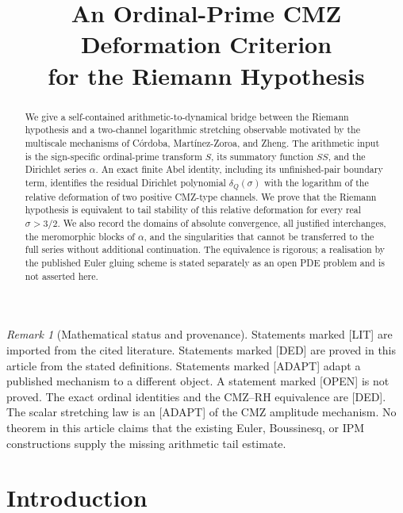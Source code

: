 \documentclass[11pt]{amsart}
\title{An Ordinal-Prime CMZ Deformation Criterion\\
for the Riemann Hypothesis}
\author{}
\date{}
\numberwithin{equation}{section}
\theoremstyle{plain}
\theoremstyle{definition}
\theoremstyle{remark}
\newtheorem{remark}[theorem]{Remark}
\begin{document}
\begin{abstract}
We give a self-contained arithmetic-to-dynamical bridge between the Riemann
hypothesis and a two-channel logarithmic stretching observable motivated by
the multiscale mechanisms of C\'ordoba, Mart\'inez-Zoroa, and Zheng.  The
arithmetic input is the sign-specific ordinal-prime transform $S$, its
summatory function $SS$, and the Dirichlet series $\alpha$.  An exact finite
Abel identity, including its unfinished-pair boundary term, identifies the
residual Dirichlet polynomial $\delta_Q(\sigma)$ with the logarithm of the
relative deformation of two positive CMZ-type channels.  We prove that the
Riemann hypothesis is equivalent to tail stability of this relative
deformation for every real $\sigma>3/2$.  We also record the domains of
absolute convergence, all justified interchanges, the meromorphic blocks of
$\alpha$, and the singularities that cannot be transferred to the full
series without additional continuation.  The equivalence is rigorous; a
realisation by the published Euler gluing scheme is stated separately as an
open PDE problem and is not asserted here.
\end{abstract}

\maketitle

\tableofcontents

\bigskip

\begin{remark}[Mathematical status and provenance]
\label{rem:status}
Statements marked \textup{[LIT]} are imported from the cited literature.
Statements marked \textup{[DED]} are proved in this article from the stated
definitions.  Statements marked \textup{[ADAPT]} adapt a published mechanism
to a different object.  A statement marked \textup{[OPEN]} is not proved.
The exact ordinal identities and the CMZ--RH equivalence are \textup{[DED]}.
The scalar stretching law is an \textup{[ADAPT]} of the CMZ amplitude
mechanism.  No theorem in this article claims that the existing Euler,
Boussinesq, or IPM constructions supply the missing arithmetic tail estimate.
\end{remark}

\section{Introduction}
\label{sec:introduction}
\end{document}
